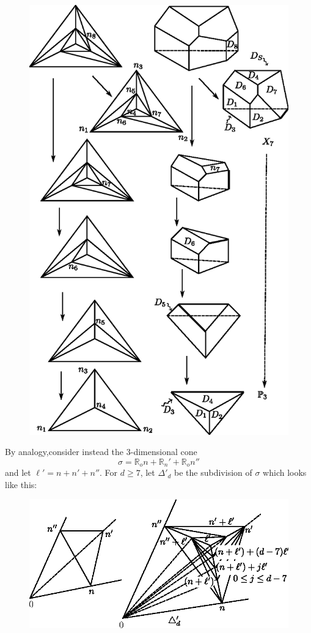 \begin{remark*}
\pageoriginale
\begin{figure}[H]
\centering 
\includegraphics{vol58-fig/fig58-27.eps} 
\end{figure}
\end{remark*}
 
By analogy,\pageoriginale consider instead the 3-dimensional cone 
$$
\sigma = \mathbb{R}_on + \mathbb{R}_n' + \mathbb{R}_on''
$$
and let $\ell' = n + n' + n''$. For $d \ge 7$, let $\Delta'_{d}$ be
the subdivision of $\sigma$ which looks like this: 
\begin{figure}[H]
\centering 
\includegraphics{vol58-fig/fig58-28.eps} 
\end{figure}

